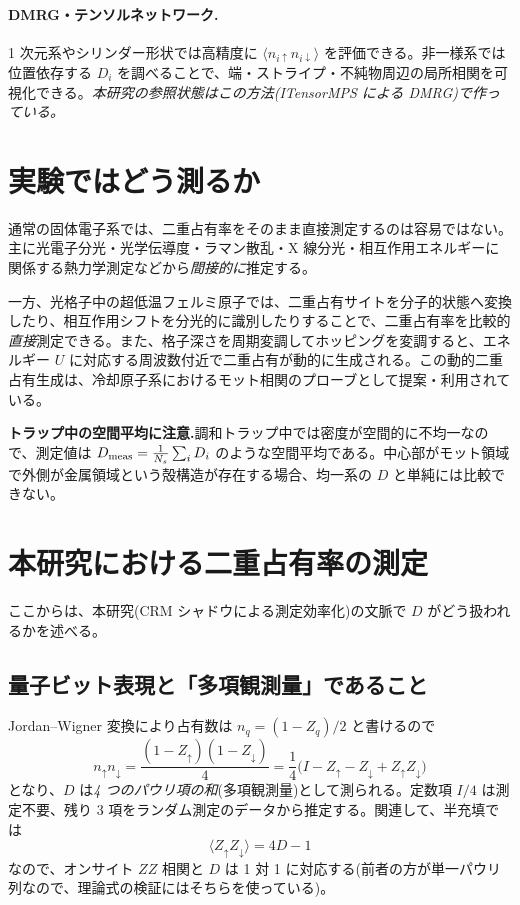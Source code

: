 \documentclass[11pt,a4paper]{ltjsarticle}
\newcommand{\ev}[1]{\langle #1\rangle}
\newcommand{\up}{\uparrow}
\newcommand{\dn}{\downarrow}
\begin{document}
\paragraph{DMRG・テンソルネットワーク.}1 次元系やシリンダー形状では高精度に $\ev{n_{i\up}n_{i\dn}}$ を評価できる。非一様系では位置依存する $D_i$ を調べることで、端・ストライプ・不純物周辺の局所相関を可視化できる。\emph{本研究の参照状態はこの方法(ITensorMPS による DMRG)で作っている。}

\section{実験ではどう測るか}

通常の固体電子系では、二重占有率をそのまま直接測定するのは容易ではない。主に光電子分光・光学伝導度・ラマン散乱・X 線分光・相互作用エネルギーに関係する熱力学測定などから\emph{間接的に}推定する。

一方、光格子中の超低温フェルミ原子では、二重占有サイトを分子的状態へ変換したり、相互作用シフトを分光的に識別したりすることで、二重占有率を比較的\emph{直接}測定できる。また、格子深さを周期変調してホッピングを変調すると、エネルギー $U$ に対応する周波数付近で二重占有が動的に生成される。この動的二重占有生成は、冷却原子系におけるモット相関のプローブとして提案・利用されている。

\begin{cautionbox}
\textbf{トラップ中の空間平均に注意.}調和トラップ中では密度が空間的に不均一なので、測定値は $D_{\rm meas}=\frac{1}{N_s}\sum_i D_i$ のような空間平均である。中心部がモット領域で外側が金属領域という殻構造が存在する場合、均一系の $D$ と単純には比較できない。
\end{cautionbox}

\section{本研究における二重占有率の測定}
\label{sec:thiswork}

ここからは、本研究(CRM シャドウによる測定効率化)の文脈で $D$ がどう扱われるかを述べる。

\subsection{量子ビット表現と「多項観測量」であること}
Jordan--Wigner 変換により占有数は $n_q=(1-Z_q)/2$ と書けるので
\begin{equation}
  n_\up n_\dn = \frac{(1-Z_\up)(1-Z_\dn)}{4}
  = \frac14\bigl(I - Z_\up - Z_\dn + Z_\up Z_\dn\bigr)
  \label{eq:docc-pauli}
\end{equation}
となり、$D$ は\emph{4 つのパウリ項の和}(多項観測量)として測られる。定数項 $I/4$ は測定不要、残り 3 項をランダム測定のデータから推定する。関連して、半充填では
\begin{equation}
  \ev{Z_\up Z_\dn} = 4D-1
\end{equation}
なので、オンサイト $ZZ$ 相関と $D$ は 1 対 1 に対応する(前者の方が単一パウリ列なので、理論式の検証にはそちらを使っている)。
\end{document}
